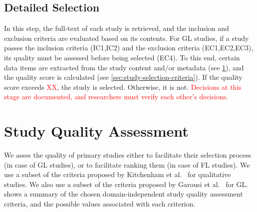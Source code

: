 \documentclass[review]{elsarticle}
\begin{document}
\subsection{Detailed Selection}
In this step, the full-text of each study is retrieved, and the inclusion and exclusion criteria are evaluated based on its contents.
For GL studies, if a study passes the inclusion criteria (IC1,IC2) and the exclusion criteria (EC1,EC2,EC3), its quality must be assessed before being selected (EC4).
To this end, certain data items are extracted from the study content and/or metadata (see \cref{sec:study-quality-assessment}), and the quality score is calculated (see \cref{sec:study-selection-criteria}).
If the quality score exceeds \textcolor{red}{XX}, the study is selected. 
Otherwise, it is not.
\textcolor{red}{Decisions at this stage are documented, and researchers must verify each other's decisions}.

\section{Study Quality Assessment}
\label{sec:study-quality-assessment}
We asses the quality of primary studies either to facilitate their selection process (in case of GL studies), or to facilitate ranking them (in case of FL studies).
We use a subset of the criteria proposed by Kitchenham et al.~\cite{Kitchenham2007SLR} for qualitative studies.
We also use a subset of the criteria proposed by Garousi et al.~\cite{Garousi2017MLR} for GL. 
 shows a summary of the chosen domain-independent study quality assessment criteria, and the possible values associated with each criterion.
\end{document}
